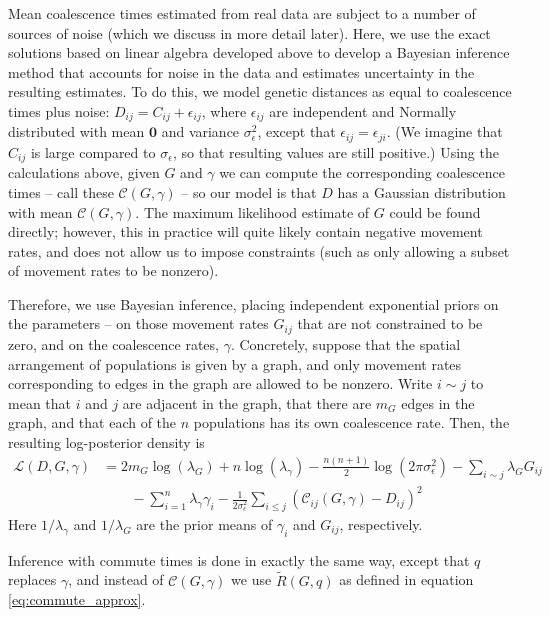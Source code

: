 \documentclass{article}
\newcommand{\comdist}{\widetilde R}
\begin{document}
Mean coalescence times estimated from real data are subject to a number of sources of noise
(which we discuss in more detail later).
Here, we use
the exact solutions based on linear algebra developed above
to develop a Bayesian inference method that accounts for noise in the data
and estimates uncertainty in the resulting estimates.
To do this, we model genetic distances as equal to coalescence times plus noise:
$D_{ij} = C_{ij} + \epsilon_{ij}$,
where $\epsilon_{ij}$ are independent and Normally distributed
with mean $\mathbf{0}$ and variance $\sigma_\epsilon^2$,
except that $\epsilon_{ij} = \epsilon_{ji}$.
(We imagine that $C_{ij}$ is large compared to $\sigma_{\epsilon}$,
so that resulting values are still positive.)
Using the calculations above, 
given $G$ and $\gamma$ we can compute the corresponding coalescence times
-- call these $\mathcal{C}(G, \gamma)$ --
so our model is that $D$ has a Gaussian distribution 
with mean $\mathcal{C}(G, \gamma)$.
The maximum likelihood estimate of $G$ could be found directly;
however, this in practice will quite likely contain negative movement rates,
and does not allow us to impose constraints
(such as only allowing a subset of movement rates to be nonzero).

Therefore, we use Bayesian inference,
placing independent exponential priors on the parameters --
on those movement rates $G_{ij}$ that are not constrained to be zero,
and on the coalescence rates, $\gamma$.
Concretely, suppose that the spatial arrangement of populations is given by a graph,
and only movement rates corresponding to edges in the graph are allowed to be nonzero.
Write $i \sim j$ to mean that $i$ and $j$ are adjacent in the graph,
that there are $m_G$ edges in the graph,
and that each of the $n$ populations has its own coalescence rate.
Then, the resulting log-posterior density is
\begin{align} \label{eq:post}
\mathcal{L}(D, G, \gamma) 
    &=
    2 m_G \log(\lambda_G) + n \log(\lambda_\gamma) 
    - \frac{n(n+1)}{2} \log(2 \pi \sigma^2_\epsilon)
	- \sum_{i \sim j} \lambda_G G_{ij}  \\
    &\qquad
    -\sum_{i=1}^n \lambda_{\gamma}\gamma_i
		-\frac{1}{2 \sigma_{\epsilon}^2} \sum_{i \leq j} \left(
            \mathcal{C}_{ij}(G,\gamma) - D_{ij}
        \right)^2 
\end{align}
Here $1/\lambda_\gamma$ and $1/\lambda_G$ are the prior means of $\gamma_i$ and $G_{ij}$,
respectively.

Inference with commute times is done in exactly the same way,
except that $q$ replaces $\gamma$,
and instead of $\mathcal{C}(G,\gamma)$ we use $\comdist(G, q)$
as defined in equation \eqref{eq:commute_approx}.
\end{document}
